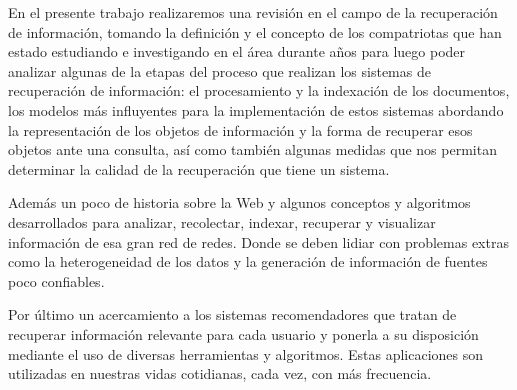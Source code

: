 En el presente trabajo realizaremos una revisión en el campo de la recuperación de información, tomando la definición y el concepto de los compatriotas que han estado estudiando e investigando en el área durante años para luego poder analizar algunas de la etapas del proceso que realizan los sistemas de recuperación de información: el procesamiento y la indexación de los documentos, los modelos más influyentes para la implementación de estos sistemas abordando la representación de los objetos de información y la forma de recuperar esos objetos ante una consulta, así como también algunas medidas que nos permitan determinar la calidad de la recuperación que tiene un sistema. \par

Además un poco de historia sobre la Web y algunos conceptos y algoritmos desarrollados para analizar, recolectar, indexar, recuperar y visualizar información de esa gran red de redes. Donde se deben lidiar con problemas extras como la heterogeneidad de los datos y la generación de información de fuentes poco confiables.\par

Por último un acercamiento a los sistemas recomendadores que tratan de recuperar información relevante para cada usuario y ponerla a su disposición mediante el uso de diversas herramientas y algoritmos. Estas aplicaciones son utilizadas en nuestras vidas cotidianas, cada vez, con más frecuencia.
